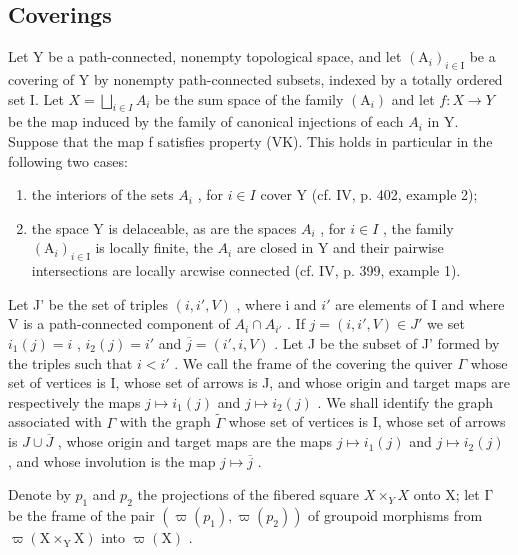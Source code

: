 \subsection{Coverings}

Let Y be a path-connected, nonempty topological space, and let \((\mathrm{A}_{i})_{i\in\mathrm{I}}\) be a covering of Y by nonempty path-connected subsets, indexed by a totally ordered set I. Let \(X=\bigsqcup_{i\in I}A_{i}\) be the sum space of the family \((\mathrm{A}_{i})\) and let \(f:X\to Y\) be the map induced by the family of canonical injections of each \(A_{i}\) in Y. Suppose that the map f satisfies property (VK). This holds in particular in the following two cases:

\begin{enumerate}
\def\labelenumi{(\roman{enumi})}
\item
  the interiors of the sets \(A_{i}\) , for \(i \in I\) cover Y (cf. IV, p. 402, example 2);
\item
  the space Y is delaceable, as are the spaces \(A_{i}\) , for \(i \in I\) , the family \((\mathrm{A}_{i})_{i \in \mathrm{I}}\) is locally finite, the \(A_{i}\) are closed in Y and their pairwise intersections are locally arcwise connected (cf. IV, p. 399, example 1).
\end{enumerate}

Let J' be the set of triples \((i, i', V)\) , where i and \(i'\) are elements of I and where V is a path-connected component of \(A_i \cap A_{i'}\) . If \(j = (i, i', V) \in J'\) we set \(i_1(j) = i\) , \(i_2(j) = i'\) and \(\overline{j} = (i', i, V)\) . Let J be the subset of J' formed by the triples such that \(i < i'\) . We call the frame of the covering the quiver \(\Gamma\) whose set of vertices is I, whose set of arrows is J, and whose origin and target maps are respectively the maps \(j \mapsto i_1(j)\) and \(j \mapsto i_2(j)\) . We shall identify the graph associated with \(\Gamma\) with the graph \(\widetilde{\Gamma}\) whose set of vertices is I, whose set of arrows is \(J \cup \overline{J}\) , whose origin and target maps are the maps \(j \mapsto i_{1}(j)\) and \(j \mapsto i_{2}(j)\) , and whose involution is the map \(j \mapsto \overline{j}\) .

Denote by \(p_1\) and \(p_2\) the projections of the fibered square \(X \times_{Y} X\) onto X; let \(\textsf{Γ}\) be the frame of the pair \((\varpi(p_1), \varpi(p_2))\) of groupoid morphisms from \(\varpi(\mathrm{X} \times_{\mathrm{Y}} \mathrm{X})\) into \(\varpi(\mathrm{X})\) .

